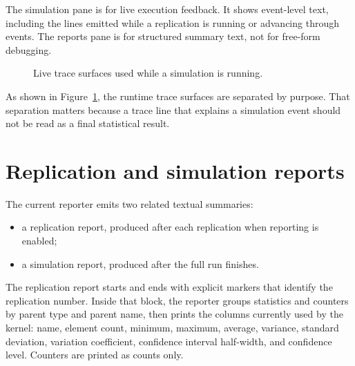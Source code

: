 The simulation pane is for live execution feedback. It shows event-level text,
including the lines emitted while a replication is running or advancing through
events. The reports pane is for structured summary text, not for free-form
debugging.

\begin{figure}[htbp]
\centering
\caption{Live trace surfaces used while a simulation is running.}
\label{fig:results-trace}
\end{figure}

As shown in Figure~\ref{fig:results-trace}, the runtime trace surfaces are
separated by purpose. That separation matters because a trace line that explains
a simulation event should not be read as a final statistical result.

\section{Replication and simulation reports}
\label{sec:results-reports}

The current reporter emits two related textual summaries:
\begin{itemize}
\item a replication report, produced after each replication when reporting is
enabled;
\item a simulation report, produced after the full run finishes.
\end{itemize}

The replication report starts and ends with explicit markers that identify the
replication number. Inside that block, the reporter groups statistics and
counters by parent type and parent name, then prints the columns currently used
by the kernel: name, element count, minimum, maximum, average, variance,
standard deviation, variation coefficient, confidence interval half-width, and
confidence level. Counters are printed as counts only.

